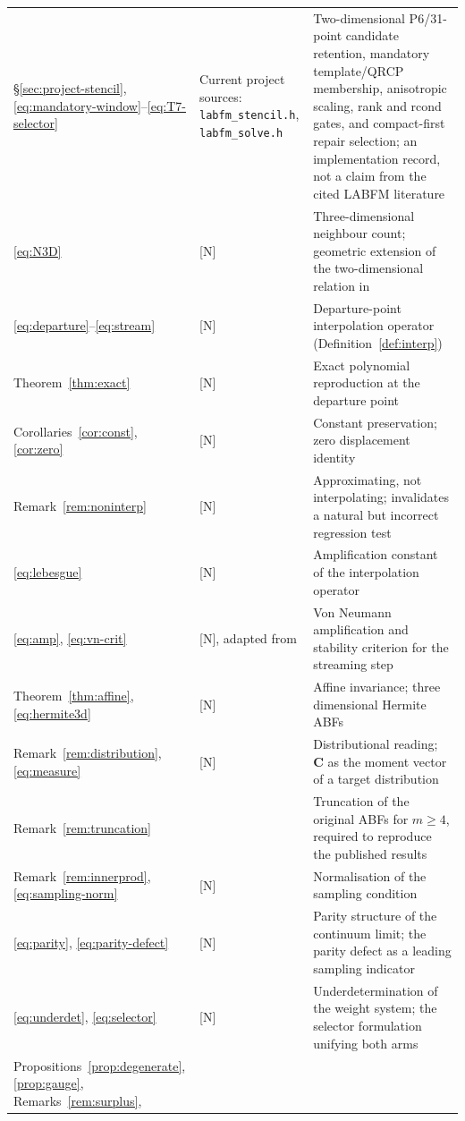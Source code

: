 \documentclass[11pt,a4paper]{article}
\renewcommand{\arraystretch}{1.2}
\newenvironment{widetable}
  {\begingroup\small\setlength{\tabcolsep}{4pt}%
   \renewcommand{\arraystretch}{1.15}%
   \setlength{\LTpre}{0.8em}\setlength{\LTpost}{0.8em}}
  {\endgroup}
\newcommand{\New}{\textcolor{blue!60!black}{\textsf{[N]}}}
\begin{document}
\begin{widetable}
\begin{longtable}{@{}P{3.9cm}P{4.45cm}P{7.3cm}@{}}
\midrule
\S\ref{sec:project-stencil},
\eqref{eq:mandatory-window}--\eqref{eq:T7-selector} & Current project sources:
\texttt{labfm\_stencil.h}, \texttt{labfm\_solve.h} & Two-dimensional P6/31-point
candidate retention, mandatory template/QRCP membership, anisotropic scaling, rank and
rcond gates, and compact-first repair selection; an implementation record, not a claim
from the cited LABFM literature \\
\eqref{eq:N3D} & \New & Three-dimensional neighbour count; geometric extension of the
two-dimensional relation in \cite[\S 2]{KL2021} \\
\eqref{eq:departure}--\eqref{eq:stream} & \New & Departure-point interpolation
operator (Definition~\ref{def:interp}) \\
Theorem~\ref{thm:exact} & \New & Exact polynomial reproduction at the departure point \\
Corollaries~\ref{cor:const}, \ref{cor:zero} & \New & Constant preservation; zero
displacement identity \\
Remark~\ref{rem:noninterp} & \New & Approximating, not interpolating; invalidates a
natural but incorrect regression test \\
\eqref{eq:lebesgue} & \New & Amplification constant of the interpolation operator \\
\eqref{eq:amp}, \eqref{eq:vn-crit} & \New, adapted from
\cite[\S 4, Eqs.~(13a)--(13c)]{KL2021} & Von Neumann amplification and stability
criterion for the streaming step \\
Theorem~\ref{thm:affine}, \eqref{eq:hermite3d} & \New & Affine invariance; three
dimensional Hermite ABFs \\
Remark~\ref{rem:distribution}, \eqref{eq:measure} & \New & Distributional reading;
$\bm C$ as the moment vector of a target distribution \\
Remark~\ref{rem:truncation} & \cite[Appendix A]{KLN2020} & Truncation of the original
ABFs for $m\ge4$, required to reproduce the published results \\
Remark~\ref{rem:innerprod}, \eqref{eq:sampling-norm} & \New & Normalisation of the
sampling condition \\
\eqref{eq:parity}, \eqref{eq:parity-defect} & \New & Parity structure of the continuum
limit; the parity defect as a leading sampling indicator \\
\eqref{eq:underdet}, \eqref{eq:selector} & \New & Underdetermination of the weight
system; the selector formulation unifying both arms \\
Propositions~\ref{prop:degenerate}, \ref{prop:gauge}, Remarks~\ref{rem:surplus},

\end{longtable}
\end{widetable}
\end{document}
